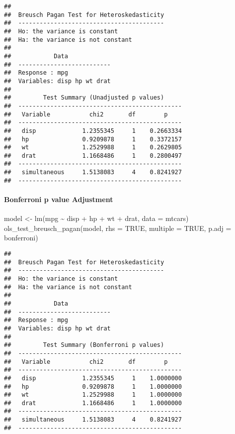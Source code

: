 \documentclass[
]{article}
\newenvironment{Shaded}{\begin{snugshade}}{\end{snugshade}}
\newcommand{\AttributeTok}[1]{\textcolor[rgb]{0.77,0.63,0.00}{#1}}
\newcommand{\ConstantTok}[1]{\textcolor[rgb]{0.00,0.00,0.00}{#1}}
\newcommand{\FunctionTok}[1]{\textcolor[rgb]{0.00,0.00,0.00}{#1}}
\newcommand{\NormalTok}[1]{#1}
\newcommand{\OtherTok}[1]{\textcolor[rgb]{0.56,0.35,0.01}{#1}}
\newcommand{\SpecialCharTok}[1]{\textcolor[rgb]{0.00,0.00,0.00}{#1}}
\newcommand{\StringTok}[1]{\textcolor[rgb]{0.31,0.60,0.02}{#1}}
\begin{document}
\begin{verbatim}
## 
##  Breusch Pagan Test for Heteroskedasticity
##  -----------------------------------------
##  Ho: the variance is constant            
##  Ha: the variance is not constant        
## 
##            Data            
##  --------------------------
##  Response : mpg 
##  Variables: disp hp wt drat 
## 
##         Test Summary (Unadjusted p values)       
##  ----------------------------------------------
##   Variable           chi2       df        p     
##  ----------------------------------------------
##   disp             1.2355345     1    0.2663334 
##   hp               0.9209878     1    0.3372157 
##   wt               1.2529988     1    0.2629805 
##   drat             1.1668486     1    0.2800497 
##  ----------------------------------------------
##   simultaneous     1.5138083     4    0.8241927 
##  ----------------------------------------------
\end{verbatim}

\hypertarget{bonferroni-p-value-adjustment}{%
\paragraph{Bonferroni p value
Adjustment}\label{bonferroni-p-value-adjustment}}

\begin{Shaded}
\begin{Highlighting}[]
\NormalTok{model }\OtherTok{\textless{}{-}} \FunctionTok{lm}\NormalTok{(mpg }\SpecialCharTok{\textasciitilde{}}\NormalTok{ disp }\SpecialCharTok{+}\NormalTok{ hp }\SpecialCharTok{+}\NormalTok{ wt }\SpecialCharTok{+}\NormalTok{ drat, }\AttributeTok{data =}\NormalTok{ mtcars)}
\FunctionTok{ols\_test\_breusch\_pagan}\NormalTok{(model, }\AttributeTok{rhs =} \ConstantTok{TRUE}\NormalTok{, }\AttributeTok{multiple =} \ConstantTok{TRUE}\NormalTok{, }\AttributeTok{p.adj =} \StringTok{\textquotesingle{}bonferroni\textquotesingle{}}\NormalTok{)}
\end{Highlighting}
\end{Shaded}

\begin{verbatim}
## 
##  Breusch Pagan Test for Heteroskedasticity
##  -----------------------------------------
##  Ho: the variance is constant            
##  Ha: the variance is not constant        
## 
##            Data            
##  --------------------------
##  Response : mpg 
##  Variables: disp hp wt drat 
## 
##         Test Summary (Bonferroni p values)       
##  ----------------------------------------------
##   Variable           chi2       df        p     
##  ----------------------------------------------
##   disp             1.2355345     1    1.0000000 
##   hp               0.9209878     1    1.0000000 
##   wt               1.2529988     1    1.0000000 
##   drat             1.1668486     1    1.0000000 
##  ----------------------------------------------
##   simultaneous     1.5138083     4    0.8241927 
##  ----------------------------------------------
\end{verbatim}
\end{document}
